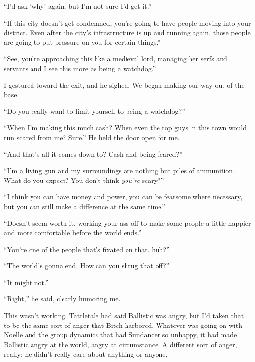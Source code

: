 ``I'd ask `why' again, but I'm not sure I'd get it.''



``If this city doesn't get condemned, you're going to have people moving into your district.  Even after the city's infrastructure is up and running again, those people are going to put pressure on you for certain things.''



``See, you're approaching this like a medieval lord, managing her serfs and servants and I see this more as being a watchdog.''



I gestured toward the exit, and he sighed.  We began making our way out of the base.



``Do you really want to limit yourself to being a watchdog?''



``When I'm making this much cash?  When even the top guys in this town would run scared from me?  Sure.''  He held the door open for me.



``And that's all it comes down to?  Cash and being feared?''



``I'm a living gun and my surroundings are nothing but piles of ammunition.  What do you expect?  You don't think \emph{you're} scary?''



``I think you can have money and power, you can be fearsome where necessary, but you can still make a difference at the same time.''



``Doesn't seem worth it, working your ass off to make some people a little happier and more comfortable before the world ends.''



``You're one of the people that's fixated on that, huh?''



``The world's gonna end.  How can you shrug that off?''



``It might not.''



``Right,'' he said, clearly humoring me.



This wasn't working.  Tattletale had said Ballistic was angry, but I'd taken that to be the same sort of anger that Bitch harbored.  Whatever was going on with Noelle and the group dynamics that had Sundancer so unhappy, it had made Ballistic angry at the world, angry at circumstance.  A different sort of anger, really: he didn't really care about anything or anyone.



